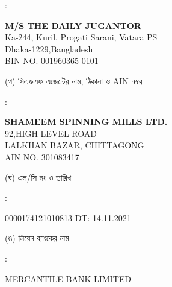 \documentclass[12pt]{article}
\newcommand{\lcno}{0000174121010813}
\newcommand{\lcdt}{14.11.2021}
\newcommand{\lienbank}{MERCANTILE BANK LIMITED}
\newcommand{\tdj}{M/S THE DAILY JUGANTOR}
\newcommand{\tdja}{Ka-244, Kuril, Progati Sarani, Vatara PS
\\
Dhaka-1229,Bangladesh}
\newcommand{\impn}{\tdj}
\newcommand{\impadd}{\tdja}
\newcommand{\impbin}{001960365-0101}
\newcommand{\cnfn}{SHAMEEM SPINNING MILLS LTD.}
\newcommand{\cnfadd}{92,HIGH LEVEL ROAD
\\
LALKHAN BAZAR, CHITTAGONG}
\newcommand{\cnfain}{301083417}
\begin{document}
\begin{minipage}[t]{0.02\linewidth}
:
\end{minipage}
\begin{minipage}[t]{0.53\linewidth}
\textbf{{\impn}}
\\
{\impadd}
\\
BIN NO. {\impbin}
\\
\end{minipage}
\begin{minipage}[t]{0.05\linewidth}
\hspace*{1em}
\end{minipage}
\begin{minipage}[t]{0.40\linewidth}
(গ) সিএন্ডএফ এজেন্টের নাম, ঠিকানা
ও AIN নম্বর
\end{minipage}
\begin{minipage}[t]{0.02\linewidth}
:
\end{minipage}
\begin{minipage}[t]{0.53\linewidth}
\textbf{{\cnfn}}
\\
{\cnfadd}
\\
AIN NO. {\cnfain}
\\
\end{minipage}
\begin{minipage}[t]{0.05\linewidth}
\hspace*{1em}
\end{minipage}
\begin{minipage}[t]{0.40\linewidth}
(ঘ) এল/সি নং ও তারিখ
\end{minipage}
\begin{minipage}[t]{0.02\linewidth}
:
\end{minipage}
\begin{minipage}[t]{0.53\linewidth}
{\lcno} \hspace{2em} DT: {\lcdt}
\\
\end{minipage}
\begin{minipage}[t]{0.05\linewidth}
\hspace*{1em}
\end{minipage}
\begin{minipage}[t]{0.40\linewidth}
(ঙ) লিয়েন ব্যাংকের নাম
\end{minipage}
\begin{minipage}[t]{0.02\linewidth}
:
\end{minipage}
\begin{minipage}[t]{0.53\linewidth}
{\lienbank}
\\
\end{minipage}
\end{document}
